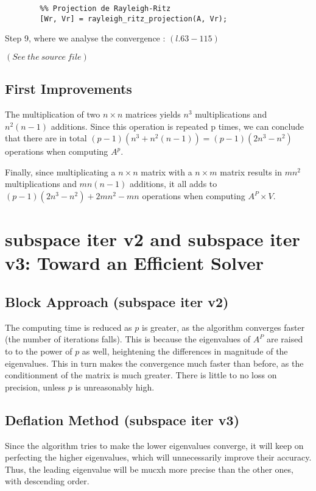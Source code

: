 \documentclass{article}
\begin{document}
\begin{lstlisting}
        %% Projection de Rayleigh-Ritz
        [Wr, Vr] = rayleigh_ritz_projection(A, Vr);
\end{lstlisting}

Step 9, where we analyse the convergence : $(l.63-115)$

$(See\ the\ source\ file)$

\subsection{First Improvements}

The multiplication of two $n \times n$ matrices yields $n^3$ multiplications and $n^2(n-1)$ additions. Since this operation is repeated p times, we can conclude that there are in total $(p-1)(n^3 + n^2(n-1)) = (p-1)(2n^3 - n^2)$ operations when computing $A^p$.

Finally, since multiplicating a $n\times n$ matrix with a $n \times m$ matrix results in $mn^2$ multiplications and $mn(n-1)$ additions, it all adds to $(p-1)(2n^3 - n^2) + 2mn^2 - mn$ operations when computing $A^P\times V$.

\section{subspace iter v2 and subspace iter v3: Toward an Efficient Solver}

\subsection{Block Approach (subspace iter v2)}

The computing time is reduced as $p$ is greater, as the algorithm converges faster (the number of iterations falls). This is because the eigenvalues of $A^P$ are raised to to the power of $p$ as well, heightening the differences in magnitude of the eigenvalues. This in turn makes the convergence much faster than before, as the conditionment of the matrix is much greater. There is little to no loss on precision, unless $p$ is unreasonably high.

\subsection{Deflation Method (subspace iter v3)}

Since the algorithm tries to make the lower eigenvalues converge, it will keep on perfecting the higher eigenvalues, which will unnecessarily improve their accuracy. Thus, the leading eigenvalue will be mucxh more precise than the other ones, with descending order.
\end{document}
